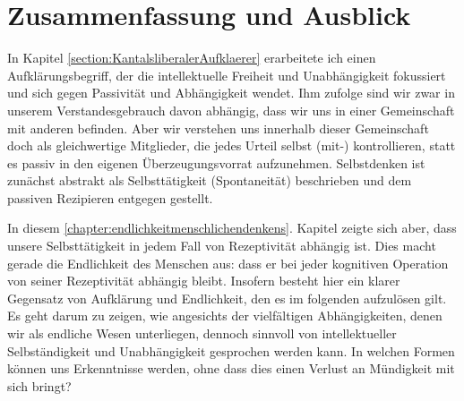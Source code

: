\section{Zusammenfassung und Ausblick}
In Kapitel \ref{section:KantalsliberalerAufklaerer} erarbeitete ich einen
Aufklärungsbegriff, der die intellektuelle Freiheit und
Unabhängigkeit fokussiert und sich gegen Passivität und Abhängigkeit wendet.
Ihm zufolge sind wir zwar in unserem Verstandesgebrauch davon abhängig, dass wir uns
in einer Gemeinschaft mit anderen befinden. Aber wir verstehen uns innerhalb
dieser Gemeinschaft doch als gleichwertige Mitglieder, die jedes Urteil selbst
\mbox{(mit-)} kontrollieren, statt es passiv in den eigenen
Überzeugungsvorrat aufzunehmen. Selbstdenken ist zunächst abstrakt als
Selbsttätigkeit (Spontaneität) beschrieben und dem passiven Rezipieren entgegen
gestellt.

In diesem \ref{chapter:endlichkeitmenschlichendenkens}. Kapitel zeigte sich
aber, dass unsere Selbsttätigkeit in jedem Fall von Rezeptivität abhängig ist.
Dies macht gerade die Endlichkeit des Menschen aus:
dass er bei jeder kognitiven Operation von seiner Rezeptivität abhängig bleibt.
Insofern besteht hier ein klarer Gegensatz von Aufklärung und Endlichkeit, den
es im folgenden aufzulösen gilt. Es geht darum zu zeigen, wie angesichts der
vielfältigen Abhängigkeiten, denen wir als endliche Wesen unterliegen, dennoch
sinnvoll von intellektueller Selbständigkeit und Unabhängigkeit gesprochen
werden kann. In welchen Formen können uns Erkenntnisse 
werden, ohne dass dies einen Verlust an Mündigkeit mit sich bringt?

